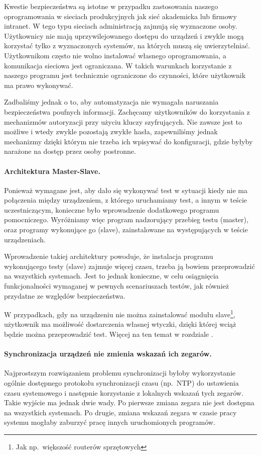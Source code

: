 \documentclass[00-praca-magisterska.tex]{subfiles}
\begin{document}
Kwestie bezpieczeństwa są istotne w przypadku zastosowania naszego
oprogramowania w sieciach produkcyjnych jak sieć akademicka lub firmowy
intranet. W tego typu sieciach administracją zajmują się wyznaczone osoby.
Użytkownicy nie mają uprzywilejowanego dostępu do urządzeń i zwykle mogą
korzystać tylko z wyznaczonych systemów, na których muszą się uwierzytelniać.
Użytkownikom często nie wolno instalować własnego oprogramowania, a komunikacja
sieciowa jest ograniczana. W takich warunkach korzystanie z naszego programu
jest technicznie ograniczone do czynności, które użytkownik ma prawo wykonywać. 

Zadbaliśmy jednak o to, aby automatyzacja nie wymagała naruszania
bezpieczeństwa poufnych informacji. Zachęcamy użytkowników do korzystania z
mechanizmów autoryzacji przy użyciu kluczy szyfrujących. Nie zawsze jest to
możliwe i wtedy zwykle pozostają zwykłe hasła, zapewniliśmy jednak mechanizmy
dzięki którym nie trzeba ich wpisywać do konfiguracji, gdzie byłyby narażone na
dostęp przez osoby postronne.

\paragraph{Architektura Master-Slave.} Ponieważ wymagane jest, aby dało się
wykonywać test w sytuacji kiedy nie ma połączenia między urządzeniem, z którego
uruchamiamy test, a innym w teście uczestniczącym, konieczne było wprowadzenie
dodatkowego programu pomocniczego. Wyróżniamy więc program nadzorujący
przebieg testu (master), oraz programy wykonujące go (slave), zainstalowane na
występujących w teście urządzeniach.

Wprowadzenie takiej architektury powoduje, że instalacja programu wykonującego
testy (slave) zajmuje więcej czasu, trzeba ją bowiem przeprowadzić na
wszystkich systemach. Jest to jednak konieczne, w celu osiągnięcia
funkcjonalności wymaganej w pewnych scenariuszach testów, jak również przydatne
ze względów bezpieczeństwa.

W przypadkach, gdy na urządzeniu nie można zainstalować modułu
slave\footnote{Jak np.~większość routerów sprzętowych}, użytkownik ma możliwość
dostarczenia własnej wtyczki, dzięki której wciąż będzie można przeprowadzić
test. Więcej na ten temat w rozdziale .

\paragraph{Synchronizacja urządzeń nie zmienia wskazań ich zegarów.}
Najprostszym rozwiązaniem problemu synchronizacji byłoby wykorzystanie ogólnie
dostępnego protokołu synchronizacji czasu (np.~NTP) do ustawienia czasu
systemowego i następnie korzystanie z lokalnych wskazań tych zegarów. Takie
wyjście ma jednak dwie wady. Po pierwsze zmiana zegara nie jest dostępna na
wszystkich systemach. Po drugie, zmiana wskazań zegara w czasie pracy systemu
mogłaby zaburzyć pracę innych uruchomionych programów.
\end{document}
